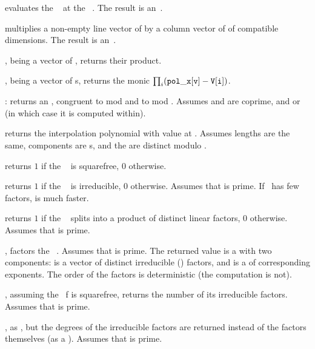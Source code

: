  evaluates the ~
at the ~. The result is an~.

 multiplies a non-empty line
vector of by a column vector of  of compatible dimensions.
The result is an~.

,  being a vector of ,
returns their product.

,  being a vector
of s, returns the monic 
$\prod_i ({\tt pol\_x[v]} - {\tt V[i]})$.

:
returns an , congruent to  mod  and to  mod
. Assumes  and  are coprime, and 
or  (in which case it is computed within).

 returns the 
interpolation polynomial with value  at . Assumes lengths
are the same, components are s, and the  are distinct
modulo .

 returns $1$ if the
~ is squarefree, $0$ otherwise.

 returns $1$ if the ~
is irreducible, $0$ otherwise. Assumes that  is prime. If~ has
few factors,  is much faster.

 returns $1$ if the
~ splits into a product of distinct linear factors, $0$
otherwise. Assumes that  is prime.

, factors the ~. Assumes
that  is prime. The returned value  is a  with two
components:  is a vector of distinct irreducible ()
factors, and  is a  of corresponding exponents. The
order of the factors is deterministic (the computation is not).

, assuming the ~f is squarefree,
returns the number of its irreducible factors. Assumes that  is prime.

, as , but the
degrees of the irreducible factors are returned instead of the factors
themselves (as a ). Assumes that  is prime.

